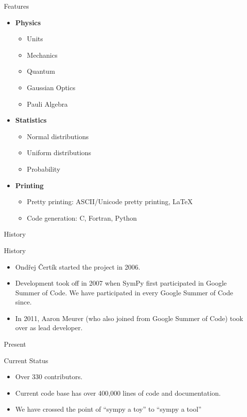\documentclass[xcolor=svgnames]{beamer}
\begin{document}
\begin{frame}{Features}
\begin{multicols}{2}
\begin{itemize}
    \item \textbf{Physics}
      \begin{itemize}
        \tiny
      \item Units
      \item Mechanics
      \item Quantum
      \item Gaussian Optics
      \item Pauli Algebra
      \end{itemize}

    \item \textbf{Statistics}
      \begin{itemize}
        \tiny
      \item Normal distributions
      \item Uniform distributions
      \item Probability
      \end{itemize}

    \item \textbf{Printing}
      \begin{itemize}
        \tiny
      \item Pretty printing: ASCII/Unicode pretty printing, LaTeX
      \item Code generation: C, Fortran, Python
      \end{itemize}
    \end{itemize}
  \end{multicols}
\end{frame}

\begin{frame}{History}
  \begin{block}{History}
    \begin{itemize}
    \item Ondřej Čertík started the project in 2006.
    \item Development took off in 2007 when SymPy first participated in Google
      Summer of Code. We have participated in every Google Summer of Code since.
    \item In 2011, Aaron Meurer (who also joined from Google Summer of Code) took
      over as lead developer.
    \end{itemize}
  \end{block}
\end{frame}

\begin{frame}{Present}
  \begin{block}{Current Status}
    \begin{itemize}
    \item Over 330 contributors.
    \item Current code base has over 400,000 lines of code and documentation.
    \item We have crossed the point of ``sympy a toy'' to ``sympy a tool''
    \end{itemize}
  \end{block}
\end{frame}
\end{document}
